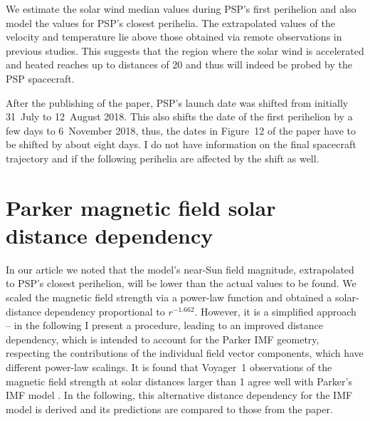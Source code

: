 We estimate the solar wind median values during PSP’s first perihelion and also model the values for PSP’s closest perihelia. The extrapolated values of the velocity and temperature lie above those obtained via remote observations in previous studies. This suggests that the region where the solar wind is accelerated and heated reaches up to distances of \SI{20}{\Rs} and thus will indeed be probed by the PSP spacecraft.

After the publishing of the paper, PSP's launch date was shifted from initially 31~July to 12~August 2018. This also shifts the date of the first perihelion by a few days to 6~November 2018, thus, the dates in Figure~12 of the paper have to be shifted by about eight days. I do not have information on the final spacecraft trajectory and if the following perihelia are affected by the shift as well.


\section{Parker magnetic field solar distance dependency}
In our article we noted that the model's near-Sun field magnitude, extrapolated to PSP's closest perihelion, will be lower than the actual values to be found. We scaled the magnetic field strength via a power-law function and obtained a solar-distance dependency proportional to $r^{-1.662}$. However, it is a simplified approach -- in the following I present a procedure, leading to an improved distance dependency, which is intended to account for the Parker IMF geometry, respecting the contributions of the individual field vector components, which have different power-law scalings. It is found that Voyager~1 observations of the magnetic field strength at solar distances larger than \SI{1}{\au} agree well with Parker’s IMF model \citep{Burlaga1984,Burlaga2002}. In the following, this alternative distance dependency for the IMF model is derived and its predictions are compared to those from the paper.

